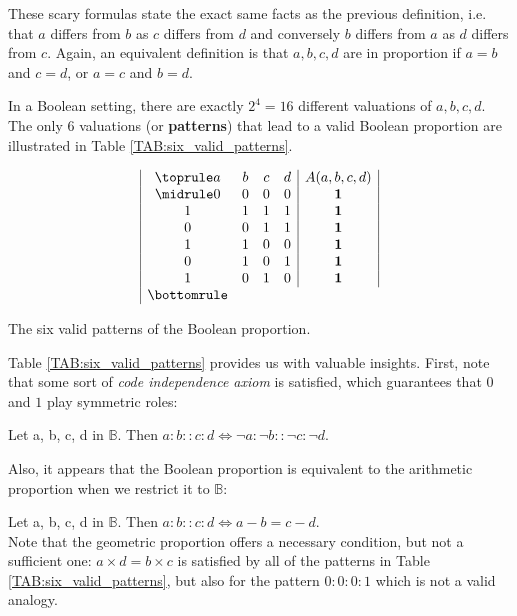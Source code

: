 These scary formulas state the exact same facts as the previous definition,
i.e. that $a$ differs from $b$ as $c$ differs from $d$ and conversely $b$
differs from $a$ as $d$ differs from $c$. Again, an equivalent definition is
that $a, b, c, d$ are in proportion if $a = b$ and $c = d$, or $a = c$ and $b =
d$.

In a Boolean setting, there are exactly $2^4 = 16$ different valuations of $a,
b, c, d$. The only $6$ valuations (or \textbf{patterns}) that lead to a valid
Boolean proportion are illustrated in Table \ref{TAB:six_valid_patterns}.

\begin{table}[t]
  \centering
  $$
  \begin{array}{|cccc|c|}
    \toprule
    a & b & c & d &  A(a, b, c, d)\\
    \midrule
    0 & 0 & 0 & 0 &   \textbf{1}\\
    1 & 1 & 1 & 1 &   \textbf{1}\\
    0 & 0 & 1 & 1 &   \textbf{1}\\
    1 & 1 & 0 & 0 &   \textbf{1}\\
    0 & 1 & 0 & 1 &   \textbf{1}\\
    1 & 0 & 1 & 0 &   \textbf{1}\\
    \bottomrule
  \end{array}
  $$
  \caption{The six valid patterns of the Boolean proportion.}
  \label{TAB:six_valid_patterns}
\end{table}

Table \ref{TAB:six_valid_patterns} provides us with valuable insights. First,
note that some sort of {\it code independence axiom} is satisfied, which
guarantees that $0$ and $1$ play symmetric roles:

\begin{property}
  Let a, b, c, d in $\mathbb{B}$. Then  $a : b :: c : d \iff \neg a :  \neg
  b ::  \neg c :  \neg d.$
\end{property}

Also, it appears that the Boolean proportion is equivalent to the arithmetic
proportion when we restrict it to $\mathbb{B}$:

\begin{property}
  Let a, b, c, d in $\mathbb{B}$. Then  $a : b :: c : d \iff a - b = c - d$.\\
  Note that the geometric proportion offers a necessary condition, but not a
  sufficient one: $a \times d = b\times c$ is satisfied by all of the patterns
  in Table \ref{TAB:six_valid_patterns}, but also for the pattern $0: 0: 0: 1$
  which is not a valid analogy.
\end{property}

